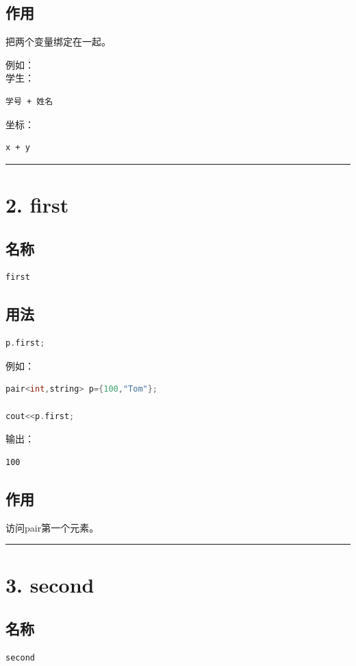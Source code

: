 \documentclass[9pt,twocolumn]{extarticle}
\begin{document}
\subsection{作用}
把两个变量绑定在一起。

例如：\\
学生：
\begin{lstlisting}
学号 + 姓名
\end{lstlisting}
坐标：
\begin{lstlisting}
x + y
\end{lstlisting}

\noindent\rule{\linewidth}{0.4pt}

\section{2. first}

\subsection{名称}
\begin{lstlisting}[language=C++]
first
\end{lstlisting}

\subsection{用法}
\begin{lstlisting}[language=C++]
p.first;
\end{lstlisting}
例如：
\begin{lstlisting}[language=C++]
pair<int,string> p={100,"Tom"};

cout<<p.first;
\end{lstlisting}
输出：
\begin{lstlisting}
100
\end{lstlisting}

\subsection{作用}
访问pair第一个元素。

\noindent\rule{\linewidth}{0.4pt}

\section{3. second}

\subsection{名称}
\begin{lstlisting}[language=C++]
second
\end{lstlisting}
\end{document}
